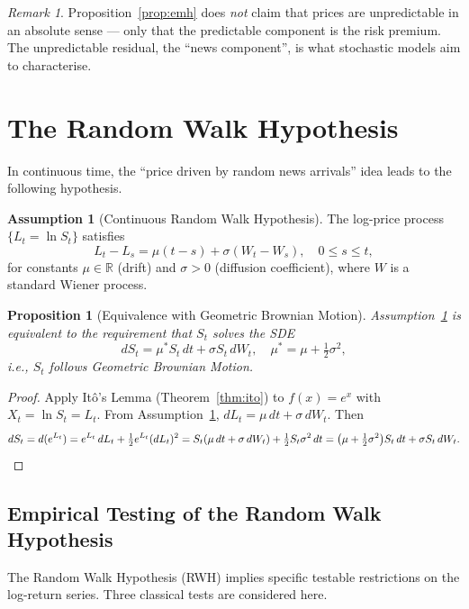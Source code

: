 \documentclass[12pt, a4paper, oneside]{report}
\theoremstyle{plain}
\newtheorem{proposition}[theorem]{Proposition}
\theoremstyle{definition}
\newtheorem{assumption}[theorem]{Assumption}
\theoremstyle{remark}
\newtheorem{remark}[theorem]{Remark}
\newcommand{\R}{\mathbb{R}}
\begin{document}
\begin{remark}
Proposition~\ref{prop:emh} does \emph{not} claim that prices are unpredictable in
an absolute sense --- only that the predictable component is the risk premium.  The
unpredictable residual, the ``news component'', is what stochastic models aim to
characterise.
\end{remark}

\section{The Random Walk Hypothesis}

In continuous time, the ``price driven by random news arrivals'' idea leads to
the following hypothesis.

\begin{assumption}[Continuous Random Walk Hypothesis]
\label{ass:crw}
The log-price process $\{L_t = \ln S_t\}$ satisfies
\[
  L_t - L_s = \mu(t - s) + \sigma(W_t - W_s), \quad 0 \leq s \leq t,
\]
for constants $\mu \in \R$ (drift) and $\sigma > 0$ (diffusion coefficient),
where $W$ is a standard Wiener process.
\end{assumption}

\begin{proposition}[Equivalence with Geometric Brownian Motion]
\label{prop:gbm_equiv}
Assumption~\ref{ass:crw} is equivalent to the requirement that $S_t$ solves
the SDE
\[
  dS_t = \mu^* S_t\,dt + \sigma S_t\,dW_t, \quad \mu^* = \mu + \tfrac{1}{2}\sigma^2,
\]
i.e., $S_t$ follows Geometric Brownian Motion.
\end{proposition}

\begin{proof}
Apply It\^{o}'s Lemma (Theorem~\ref{thm:ito}) to $f(x) = e^x$ with
$X_t = \ln S_t = L_t$.  From Assumption~\ref{ass:crw},
$dL_t = \mu\,dt + \sigma\,dW_t$.  Then
\[
  dS_t = d(e^{L_t})
  = e^{L_t}\,dL_t + \tfrac{1}{2} e^{L_t} (dL_t)^2
  = S_t(\mu\,dt + \sigma\,dW_t) + \tfrac{1}{2} S_t \sigma^2\,dt
  = \bigl(\mu + \tfrac{1}{2}\sigma^2\bigr)S_t\,dt + \sigma S_t\,dW_t. \qedhere
\]
\end{proof}

\subsection{Empirical Testing of the Random Walk Hypothesis}

The Random Walk Hypothesis (RWH) implies specific testable restrictions on
the log-return series.  Three classical tests are considered here.
\end{document}
